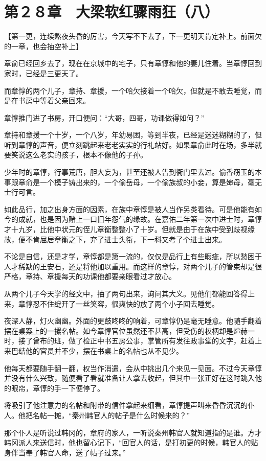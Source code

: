 \section{第２８章　大梁软红骤雨狂（八）}

【第一更，连续熬夜头昏的厉害，今天写不下去了，下一更明天肯定补上。前面欠的一章，也会抽空补上】

章俞已经回乡去了，现在在京城中的宅子，只有章惇和他的妻儿住着。当章惇回到家时，已经是三更天了。

而章惇的两个儿子，章持、章援，一个哈欠接着一个哈欠，但就是不敢去睡觉，而是在书房中等着父亲回来。

章惇推门进了书房，开口便问：“大哥，四哥，功课做得如何？”

章持和章援一个十岁，一个八岁，年幼易困，等到半夜，已经是迷迷糊糊的了，但听到章惇的声音，便立刻跳起来老老实实的行礼站好。如果章俞此时在场，多半就要笑说这么老实的孩子，根本不像他的子孙。

少年时的章惇，行事荒唐，胆大妄为，甚至还被人告到衙门里去过。偷香窃玉的本事跟章俞是一个模子铸出来的，一个偷岳母，一个偷族叔的小妾，算是婶母，毫无士行可言。

如此品行，加之出身方面的因素，在族中章惇是被人当作另类看待。可是他能有如今的成就，也是因为赌上一口旧年怨气的缘故。在嘉佑二年第一次中进士时，章惇才十九岁，比他中状元的侄儿章衡整整小了十岁。但就是由于在族中受到歧视缘故，便不肯屈居章衡之下，弃了进士头衔，下一科又考了个进士出来。

不论是自信，还是才学，章惇都是第一流的，仅仅是品行上有些暇疵，所以愁困于人才稀缺的王安石，还是将他加以重用。而这样的章惇，对两个儿子的管束却是很严格，章持、章援每天的功课他都要亲眼看过才放心。

从两个儿子今天学的经文中，抽了两句出来，询问其大义。见他们都能回答得上来，章惇忍不住绽开了一丝笑容，很爽快的放了两个小子回去睡觉。

夜深人静，灯火幽幽。外面的更鼓咚咚的响着，可章惇仍是毫无睡意。他随手翻着摆在桌案上的一摞名帖。如今章惇官位虽然还不甚高，但受伤的权柄却是煊赫一时，接了曾布的班，做了检正中书五房公事，掌管所有发往政事堂的文字，赶着上来巴结他的官员并不少，摆在书桌上的名帖也从不见少。

他每天都要随手翻一翻，权当作消遣，会从中挑出几个来见一见面。不过今天章惇并没有什么兴致，随便看了看就准备让人拿去收起，但其中一张正好在这时跳入他的眼帘，章惇的手一下便停了。

将吸引了他注意力的名帖和附带的信件拿起来细看，章惇提声叫来昏昏沉沉的仆人。他把名帖一摊，“秦州韩官人的帖子是什么时候来的？”

那个仆人是听说过韩冈的，章府的家人，一听说秦州韩官人就知道指的是谁。方才韩冈派人来送信时，他也留心记下，“回官人的话，是打初更的时候，韩官人的贴身伴当奉了韩官人命，送了帖子过来。”

